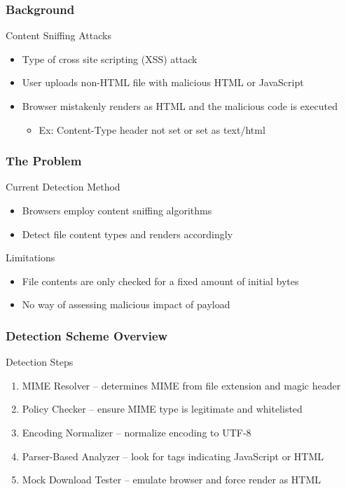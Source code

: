 \documentclass[10pt,mathserif]{beamer}
\begin{document}
\begin{frame}
  \frametitle{Background}
  \begin{block}{Content Sniffing Attacks}
    \begin{itemize}
    \item Type of cross site scripting (XSS) attack
    \item User uploads non-HTML file with malicious HTML or JavaScript
    \item Browser mistakenly renders as HTML and the malicious code is executed
      \begin{itemize}
      \item Ex: Content-Type header not set or set as text/html
      \end{itemize}
    \end{itemize}
  \end{block}
\end{frame}
\begin{frame}
  \frametitle{The Problem}
  \begin{block}{Current Detection Method}
    \begin{itemize}
    \item Browsers employ content sniffing algorithms
    \item Detect file content types and renders accordingly
    \end{itemize}
  \end{block}
  \begin{block}{Limitations}
    \begin{itemize}
    \item File contents are only checked for a fixed amount of initial bytes
    \item No way of assessing malicious impact of payload
    \end{itemize}
  \end{block}
\end{frame}
\begin{frame}
  \frametitle{Detection Scheme Overview}
  \begin{block}{Detection Steps}
    \begin{enumerate}
    \item MIME Resolver -- determines MIME from file extension and magic header
    \item Policy Checker -- ensure MIME type is legitimate and whitelisted
    \item Encoding Normalizer -- normalize encoding to UTF-8
    \item Parser-Based Analyzer -- look for tags indicating JavaScript or HTML
    \item Mock Download Tester -- emulate browser and force render as HTML
    \end{enumerate}
  \end{block}
\end{frame}
\end{document}
